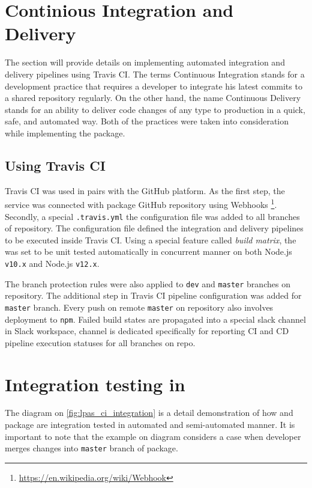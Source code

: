 \section{Continious Integration and Delivery}

The section will provide details on implementing automated integration and delivery pipelines using Travis CI.
The terms Continuous Integration stands for a development practice that requires a developer to integrate his latest commits to a shared repository regularly. On the other hand, the name Continuous Delivery stands for an ability to deliver code changes of any type to production in a quick, safe, and automated way. Both of the practices were taken into consideration while implementing the \lpas{} package. 

\subsection{Using Travis CI}

Travis CI was used in pairs with the GitHub platform. As the first step, the service was connected with \lpas{} package GitHub repository using Webhooks \footnote{\url{https://en.wikipedia.org/wiki/Webhook}}. Secondly, a special \texttt{.travis.yml} the configuration file was added to all branches of \lpas{} repository. The configuration file defined the integration and delivery pipelines to be executed inside Travis CI. Using a special feature called \textit{build matrix}, the \lpas{} was set to be unit tested automatically in concurrent manner on both Node.js \texttt{v10.x} and Node.js \texttt{v12.x}. 

The branch protection rules were also applied to \texttt{dev} and \texttt{master} branches on \lpas{} repository. The additional step in Travis CI pipeline configuration was added for \texttt{master} branch. Every push on remote \texttt{master} on \lpas{} repository also involves deployment to \texttt{npm}. Failed build states are propagated into a special slack channel in \lpa{} Slack workspace, channel is dedicated specifically for reporting CI and CD pipeline execution statuses for all branches on \lpas{} repo.

\section{Integration testing in \lpa{}}

The diagram on \autoref{fig:lpas_ci_integration} is a detail demonstration of how \lpa{} and \lpa{} package are integration tested in automated and semi-automated manner. It is important to note that the example on diagram considers a case when \lpas{} developer merges changes into \texttt{master} branch of \lpas{} package.

